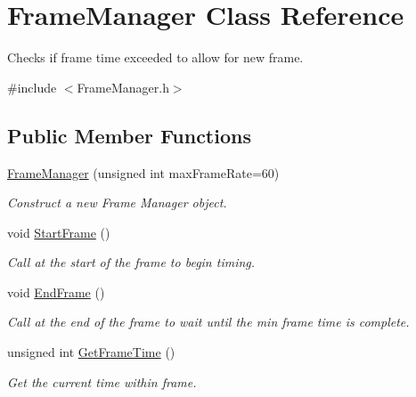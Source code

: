 \hypertarget{classFrameManager}{}\section{Frame\+Manager Class Reference}
\label{classFrameManager}


Checks if frame time exceeded to allow for new frame.  




{\ttfamily \#include $<$Frame\+Manager.\+h$>$}

\subsection*{Public Member Functions}
\begin{DoxyCompactItemize}
\item 
\hyperlink{classFrameManager_a717a67bb21670ce5b9916701e88fddfd}{Frame\+Manager} (unsigned int max\+Frame\+Rate=60)
\begin{DoxyCompactList}\small\item\em Construct a new Frame Manager object. \end{DoxyCompactList}\item 
\mbox{\label{classFrameManager_a8269f9bd88d259ba6a375439d264169d}} 
void \hyperlink{classFrameManager_a8269f9bd88d259ba6a375439d264169d}{Start\+Frame} ()
\begin{DoxyCompactList}\small\item\em Call at the start of the frame to begin timing. \end{DoxyCompactList}\item 
\mbox{\label{classFrameManager_a7e5cb5d2601fcc29337f31a76c306ece}} 
void \hyperlink{classFrameManager_a7e5cb5d2601fcc29337f31a76c306ece}{End\+Frame} ()
\begin{DoxyCompactList}\small\item\em Call at the end of the frame to wait until the min frame time is complete. \end{DoxyCompactList}\item 
unsigned int \hyperlink{classFrameManager_a18adc31d8edea896cabd539ae87a0b6d}{Get\+Frame\+Time} ()
\begin{DoxyCompactList}\small\item\em Get the current time within frame. \end{DoxyCompactList}\item 

\end{DoxyCompactItemize}
